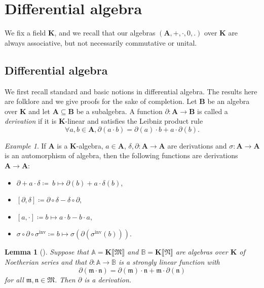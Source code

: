\documentclass{article}
\newcommand{\assign}{\coloneqq}
\newcommand{\of}{:}
\newcommand{\tmem}[1]{{\em #1\/}}
\newcommand{\tmop}[1]{\ensuremath{\operatorname{#1}}}
\newenvironment{itemizedot}{\begin{itemize} \renewcommand{\labelitemi}{$\bullet$}\renewcommand{\labelitemii}{$\bullet$}\renewcommand{\labelitemiii}{$\bullet$}\renewcommand{\labelitemiv}{$\bullet$}}{\end{itemize}}
\newtheorem{lemma}[theorem]{Lemma}
\theoremstyle{remark}\newtheorem*{convention*}{Convention}
\newtheorem{example}[theorem]{Example}
\begin{document}
\section{Differential algebra}\label{section-differential-algebra}

We fix a field $\mathbf{K}$, and we recall that our algebras $(\mathbf{A}, +,
\cdot, 0, .)$ over $\mathbf{K}$ are always associative, but not necessarily
commutative or unital.

\subsection{Differential algebra}

We first recall standard and basic notions in differential algebra. The
results here are folklore and we give proofs for the sake of completion. Let
$\mathbf{B}$ be an algebra over $\mathbf{K}$ and let $\mathbf{A} \subseteq
\mathbf{B}$ be a subalgebra. A function $\partial \of \mathbf{A}
\longrightarrow \mathbf{B}$ is called a
{\tmem{derivation}}{} if it is $\mathbf{K}$-linear and
satisfies the Leibniz product rule
\[ \forall a,b \in \mathbf{A},\partial (a \cdot b) = \partial (a) \cdot b + a \cdot \partial (b) .\]

\begin{example}
  If $\mathbf{A}$ is a $\mathbf{K}$-algebra, $a \in \mathbf{A}$, $\delta,
  \partial \of \mathbf{A} \longrightarrow \mathbf{A}$ are derivations and
  $\sigma \of \mathbf{A} \longrightarrow \mathbf{A}$ is an automorphism of
  algebra, then the following functions are derivations $\mathbf{A}
  \longrightarrow \mathbf{A}$:
  \begin{itemizedot}
    \item $\partial + a \cdot \delta \assign \: b \mapsto \partial (b) + a
    \cdot \delta (b)$,
    
    \item $[\partial, \delta] \assign \partial \circ \delta - \delta \circ
    \partial$,
    
    \item $[a, \cdot] \assign b \mapsto a \cdot b - b \cdot a$,
    
    \item $\sigma \circ \partial \circ \sigma^{\tmop{inv}} \assign b \mapsto
    \sigma (\partial (\sigma^{\tmop{inv}} (b)))$.
  \end{itemizedot}
\end{example}

\begin{lemma}[{\cite[Corollary~3.9]{vdH:noeth}}]\label{lem-strongly-lin-der}
  Suppose that $\mathbb{A}= \mathbf{K} \llbracket \mathfrak{M} \rrbracket$ and
  $\mathbb{B}= \mathbf{K} \llbracket \mathfrak{N} \rrbracket$ are algebras
  over $\mathbf{K}$ of Noetherian series and that $\partial \of \mathbb{A}
  \longrightarrow \mathbb{B}$ is a strongly linear function with
  \[ \partial (\mathfrak{m} \cdot \mathfrak{n}) = \partial (\mathfrak{m})
     \cdot \mathfrak{n}+\mathfrak{m} \cdot \partial (\mathfrak{n}) \]
  for all $\mathfrak{m}, \mathfrak{n} \in \mathfrak{M}$. Then $\partial$ is a
  derivation.
\end{lemma}
\end{document}
